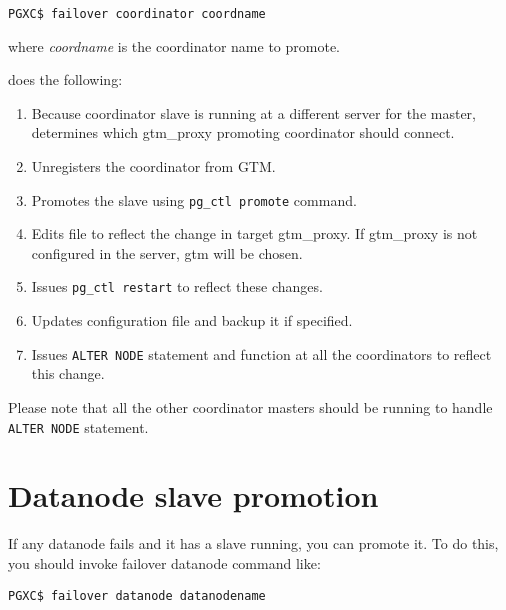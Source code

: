   \vspace{\parskip}
  \begin{lstlisting}[basicstyle=\ttfamily\normalsize,frame=single]
PGXC$ failover coordinator coordname
  \end{lstlisting}
  
  where \textit{coordname} is the coordinator name to promote.
  
   does the following:
  
  \begin{enumerate}
	  \item Because coordinator slave is running at a different server for the master,
	  		determines which gtm\_proxy promoting coordinator should connect.
	  \item Unregisters the coordinator from GTM.
	  \item Promotes the slave using \texttt{pg\_ctl promote} command.
	  \item Edits  file to reflect the change in target gtm\_proxy.
	  		If gtm\_proxy is not configured in the server, gtm will be chosen.
	  \item Issues \texttt{pg\_ctl restart} to reflect these changes.
	  \item Updates  configuration file and backup it if specified.
	  \item Issues \texttt{ALTER NODE} statement and  function
	  		at all the coordinators to reflect this change.
  \end{enumerate}
  
  Please note that all the other coordinator masters should be running to handle
  \texttt{ALTER NODE} statement.



\section{Datanode slave promotion}

  If any datanode fails and it has a slave running, you can promote it.
  To do this, you should invoke failover datanode command like:
  
  \vspace{\parskip}
  \begin{lstlisting}[basicstyle=\ttfamily\normalsize,frame=single]
PGXC$ failover datanode datanodename
  \end{lstlisting}
  
